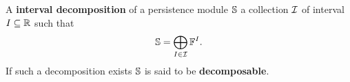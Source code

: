 A \textbf{interval decomposition} of a persistence module $\S$ a collection $\I$ of interval $I\subseteq\R$ such that
\[ \S = \bigoplus_{I\in \I} \FF^I. \]
If such a decomposition exists $\S$ is said to be \textbf{decomposable}.

%
%
%
%
%
%
